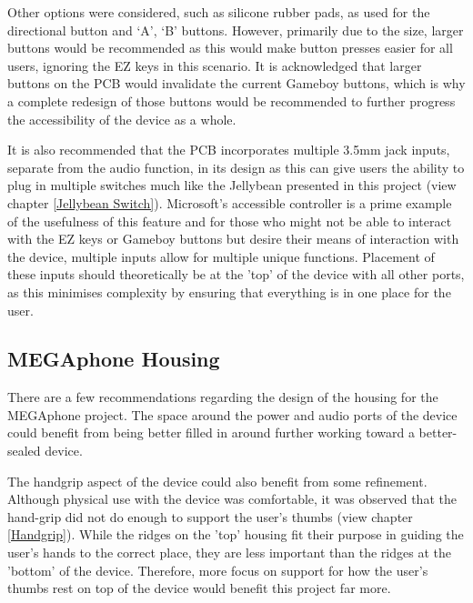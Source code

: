 Other options were considered, such as silicone rubber pads, as used for the directional button and ‘A’, ‘B’ buttons. 
However, primarily due to the size, larger buttons would be recommended as this would make button presses easier for all users, ignoring the EZ keys in this scenario.
It is acknowledged that larger buttons on the PCB would invalidate the current Gameboy buttons, which is why a complete redesign of those buttons would be recommended to further progress the accessibility of the device as a whole.

It is also recommended that the PCB incorporates multiple 3.5mm jack inputs, separate from the audio function, in its design as this can give users the ability to plug in multiple switches much like the Jellybean presented in this project (view chapter \ref{Jellybean Switch}).
Microsoft's accessible controller \cite{adaptive} is a prime example of the usefulness of this feature and for those who might not be able to interact with the EZ keys or Gameboy buttons but desire their means of interaction with the device, multiple inputs allow for multiple unique functions.
Placement of these inputs should theoretically be at the 'top' of the device with all other ports, as this minimises complexity by ensuring that everything is in one place for the user.

\subsection{MEGAphone Housing} \label{FutureHousing}

There are a few recommendations regarding the design of the housing for the MEGAphone project.
The space around the power and audio ports of the device could benefit from being better filled in around further working toward a better-sealed device.

The handgrip aspect of the device could also benefit from some refinement.
Although physical use with the device was comfortable, it was observed that the hand-grip did not do enough to support the user's thumbs (view chapter \ref{Handgrip}).
While the ridges on the 'top' housing fit their purpose in guiding the user's hands to the correct place, they are less important than the ridges at the 'bottom' of the device.
Therefore, more focus on support for how the user's thumbs rest on top of the device would benefit this project far more.

